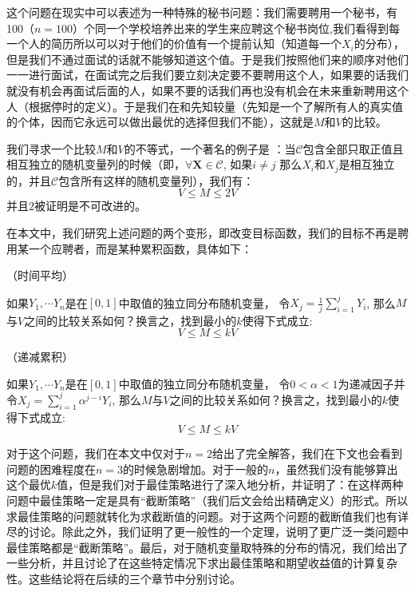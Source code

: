 \documentclass[bachelor]{thuthesis}
\begin{document}
这个问题在现实中可以表述为一种特殊的秘书问题：我们需要聘用一个秘书，有100（$n=100$）个同一个学校培养出来的学生来应聘这个秘书岗位,我们看得到每一个人的简历所以可以对于他们的价值有一个提前认知（知道每一个$X_i$的分布），但是我们不通过面试的话就不能够知道这个值。于是我们按照他们来的顺序对他们一一进行面试，在面试完之后我们要立刻决定要不要聘用这个人，如果要的话我们就没有机会再面试后面的人，如果不要的话我们再也没有机会在未来重新聘用这个人（根据停时的定义）。于是我们在和先知较量（先知是一个了解所有人的真实值的个体，因而它永远可以做出最优的选择但我们不能），这就是$M$和$V$的比较。

我们寻求一个比较$M$和$V$的不等式，一个著名的例子是\cite{prophet}
：当$\mathcal{C}$包含全部只取正值且相互独立的随机变量列的时候（即，$\forall \textbf{X}\in \mathcal{C}$, 如果$i\ne j$ 那么$X_i$和$X_j$是相互独立的，并且$\mathcal{C}$包含所有这样的随机变量列），我们有：
\[V\le M\le 2V\]
并且$2$被证明是不可改进的。

在本文中，我们研究上述问题的两个变形，即改变目标函数，我们的目标不再是聘用某一个应聘者，而是某种累积函数，具体如下：

\begin{problem}（时间平均）


如果$Y_1,\cdots Y_n$是在$[0,1]$中取值的独立同分布随机变量， 令$X_j=\frac{1}{j}\sum_{i=1}^{j}Y_i$, 那么$M$与$V$之间的比较关系如何？换言之，找到最小的$k$使得下式成立:
\[V\le M\le kV\]

\end{problem}

\begin{problem}（递减累积）



如果$Y_1,\cdots Y_n$是在$[0,1]$中取值的独立同分布随机变量， 令$0<\alpha<1$为递减因子并令$X_j=\sum_{i=1}^{j} \alpha^{j-i}Y_i$, 那么$M$与$V$之间的比较关系如何？换言之，找到最小的$k$使得下式成立:
\[V\le M\le kV\]
\end{problem}


对于这个问题，我们在本文中仅对于$n=2$给出了完全解答，我们在下文也会看到问题的困难程度在$n=3$的时候急剧增加。对于一般的$n$，虽然我们没有能够算出这个最优$k$值，但是我们对于最佳策略进行了深入地分析，并证明了：在这样两种问题中最佳策略一定是具有``截断策略''（我们后文会给出精确定义）的形式。所以求最佳策略的问题就转化为求截断值的问题。对于这两个问题的截断值我们也有详尽的讨论。除此之外，我们证明了更一般性的一个定理，说明了更广泛一类问题中最佳策略都是``截断策略''。最后，对于随机变量取特殊的分布的情况，我们给出了一些分析，并且讨论了在这些特定情况下求出最佳策略和期望收益值的计算复杂性。这些结论将在后续的三个章节中分别讨论。
\end{document}
